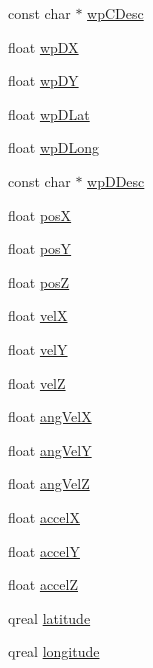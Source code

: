 \begin{DoxyCompactItemize}
const char $\ast$ \hyperlink{group___aero_sim_r_c_gaac6ce2f906c7743fd06d88ed1e63f8d1}{wp\-C\-Desc}
\item 
float \hyperlink{group___aero_sim_r_c_ga152da5c47fb8ddaa28e0e18015292750}{wp\-D\-X}
\item 
float \hyperlink{group___aero_sim_r_c_ga04968f40e2545a32b4e052fe9e632504}{wp\-D\-Y}
\item 
float \hyperlink{group___aero_sim_r_c_ga39ee4024f6f29cf4c19531ccf9f8122a}{wp\-D\-Lat}
\item 
float \hyperlink{group___aero_sim_r_c_gad90f5c9d9b7ad07bee47b18838d0ddd8}{wp\-D\-Long}
\item 
const char $\ast$ \hyperlink{group___aero_sim_r_c_ga65acd288880e17514c40557035b74fe3}{wp\-D\-Desc}
\item 
float \hyperlink{group___aero_sim_r_c_gadc6f34115ac3890af669c35382d62882}{pos\-X}
\item 
float \hyperlink{group___aero_sim_r_c_ga55c533e8057bdcc0bb7e95440eb82ff5}{pos\-Y}
\item 
float \hyperlink{group___aero_sim_r_c_gab66796c7082a7d42685f8c8c3b282c43}{pos\-Z}
\item 
float \hyperlink{group___aero_sim_r_c_gad7b2d0364e0e774256fc64c187a8c336}{vel\-X}
\item 
float \hyperlink{group___aero_sim_r_c_gae4f260f3786184d15cd8f674860f8866}{vel\-Y}
\item 
float \hyperlink{group___aero_sim_r_c_ga2703ca3343da97af3ee57b5e6f36cbb9}{vel\-Z}
\item 
float \hyperlink{group___aero_sim_r_c_ga3332a8f491a5197d28d85241d32d6f81}{ang\-Vel\-X}
\item 
float \hyperlink{group___aero_sim_r_c_ga6e7df4d87006342b893db0452de1d4db}{ang\-Vel\-Y}
\item 
float \hyperlink{group___aero_sim_r_c_gaaabca3226ef304ba1333129c54a8c777}{ang\-Vel\-Z}
\item 
float \hyperlink{group___aero_sim_r_c_gad96840cb6cfc38f4c4f8d5a907bf7a0a}{accel\-X}
\item 
float \hyperlink{group___aero_sim_r_c_gacbcac5da9b87bf7eb091f7a83b3d2fda}{accel\-Y}
\item 
float \hyperlink{group___aero_sim_r_c_ga757616fff3384f894b594e9681d39f90}{accel\-Z}
\item 
qreal \hyperlink{group___aero_sim_r_c_ga53209d2be245073a24064614cb7c2ce2}{latitude}
\item 
qreal \hyperlink{group___aero_sim_r_c_ga3b47af6ee67e1149980bd672fce0f91d}{longitude}

\end{DoxyCompactItemize}
